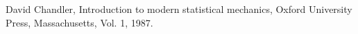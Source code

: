 \documentclass[a4paper,12pt]{article}
\begin{document}




\begin{thebibliography}{9}

  David Chandler,
  Introduction to modern statistical mechanics,
  Oxford University Press, Massachusetts,
  Vol. 1,
  1987.

\end{thebibliography}
\end{document}
